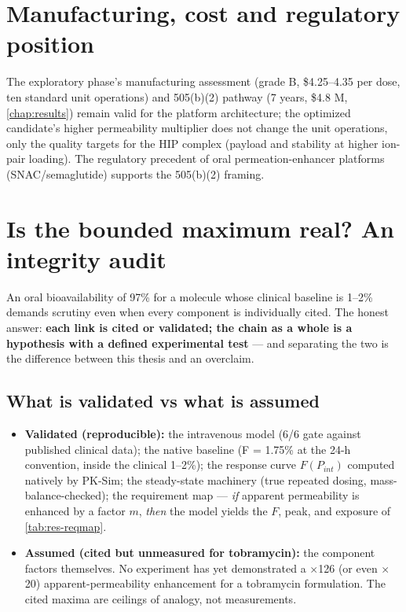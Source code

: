 \section{Manufacturing, cost and regulatory position}
The exploratory phase's manufacturing assessment (grade B, \$4.25--4.35 per dose, ten standard unit operations) and 505(b)(2) pathway (7 years, \$4.8 M, \cref{chap:results}) remain valid for the platform architecture; the optimized candidate's higher permeability multiplier does not change the unit operations, only the quality targets for the HIP complex (payload and stability at higher ion-pair loading). The regulatory precedent of oral permeation-enhancer platforms (SNAC/semaglutide) supports the 505(b)(2) framing.

\section{Is the bounded maximum real? An integrity audit}
\label{sec:integrity}

An oral bioavailability of 97\% for a molecule whose clinical baseline is 1--2\% demands scrutiny even when every component is individually cited. The honest answer: \textbf{each link is cited or validated; the chain as a whole is a hypothesis with a defined experimental test} --- and separating the two is the difference between this thesis and an overclaim.

\subsection{What is validated vs what is assumed}
\begin{itemize}
\item \textbf{Validated (reproducible):} the intravenous model (6/6 gate against published clinical data); the native baseline (F = 1.75\% at the 24-h convention, inside the clinical 1--2\%); the response curve $F(P_{int})$ computed natively by PK-Sim; the steady-state machinery (true repeated dosing, mass-balance-checked); the requirement map --- \emph{if} apparent permeability is enhanced by a factor $m$, \emph{then} the model yields the $F$, peak, and exposure of \cref{tab:res-reqmap}.
\item \textbf{Assumed (cited but unmeasured for tobramycin):} the component factors themselves. No experiment has yet demonstrated a $\times$126 (or even $\times$20) apparent-permeability enhancement for a tobramycin formulation. The cited maxima are ceilings of analogy, not measurements.
\end{itemize}

